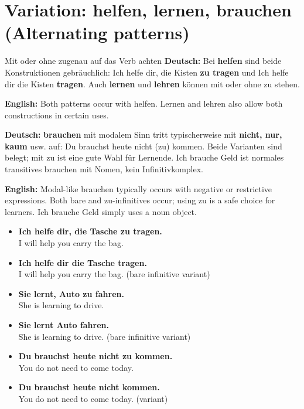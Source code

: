 \documentclass[a4paper,11pt]{article}
\newcommand{\GermanText}[1]{\textbf{Deutsch: }#1\par}
\newcommand{\EnglishText}[1]{{\small\color{SoftGray}\textbf{English: }#1\par}}
\newcommand{\ExampleItem}[2]{\item \textbf{#1}\\{\small\color{SoftGray}#2}}
\newcommand{\DEEN}[2]{\GermanText{#1}\EnglishText{#2}}
\newcommand{\Pair}[2]{\ExampleItem{#1}{#2}}
\begin{document}
\section{Variation: helfen, lernen, brauchen \textnormal{(Alternating patterns)}}
\begin{grammarentry}{Mit oder ohne zu}{genau auf das Verb achten}
\DEEN{Bei \textbf{helfen} sind beide Konstruktionen gebräuchlich: \glqq Ich helfe dir, die Kisten \textbf{zu tragen}\grqq{} und \glqq Ich helfe dir die Kisten \textbf{tragen}\grqq. Auch \textbf{lernen} und \textbf{lehren} können mit oder ohne zu stehen.}{Both patterns occur with helfen. Lernen and lehren also allow both constructions in certain uses.}
\DEEN{\textbf{brauchen} mit modalem Sinn tritt typischerweise mit \textbf{nicht, nur, kaum} usw. auf: \glqq Du brauchst heute nicht (zu) kommen.\grqq{} Beide Varianten sind belegt; mit zu ist eine gute Wahl für Lernende. \glqq Ich brauche Geld\grqq{} ist normales transitives brauchen mit Nomen, kein Infinitivkomplex.}{Modal-like brauchen typically occurs with negative or restrictive expressions. Both bare and zu-infinitives occur; using zu is a safe choice for learners. Ich brauche Geld simply uses a noun object.}
\end{grammarentry}
\begin{exbox}\begin{itemize}
\Pair{Ich helfe dir, die Tasche zu tragen.}{I will help you carry the bag.}
\Pair{Ich helfe dir die Tasche tragen.}{I will help you carry the bag. (bare infinitive variant)}
\Pair{Sie lernt, Auto zu fahren.}{She is learning to drive.}
\Pair{Sie lernt Auto fahren.}{She is learning to drive. (bare infinitive variant)}
\Pair{Du brauchst heute nicht zu kommen.}{You do not need to come today.}
\Pair{Du brauchst heute nicht kommen.}{You do not need to come today. (variant)}
\end{itemize}\end{exbox}
\end{document}
